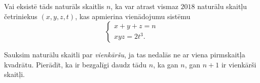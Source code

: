 \documentclass[11pt]{article}
\begin{document}
\begin{problem}[BW.TST.2018.15]
Vai eksistē tāds naturāls skaitlis $n$, ka var atrast vismaz $2018$ naturālu skaitļu četriniekus $(x,y,z,t)$, 
kas apmierina vienādojumu sistēmu
\[ \left\{ \begin{array}{l}
x + y + z = n\\
xyz = 2t^3. 
\end{array} \right. \]
\end{problem}

\begin{problem}[BW.TST.2018.16]
Sauksim naturālu skaitli par {\em vienkāršu}, ja tas nedalās ne ar viena pirmskaitļa kvadrātu. 
Pierādīt, ka ir bezgalīgi daudz tādu $n$, ka gan $n$, gan $n+1$ ir vienkārši skaitļi.
\end{problem}
\end{document}
